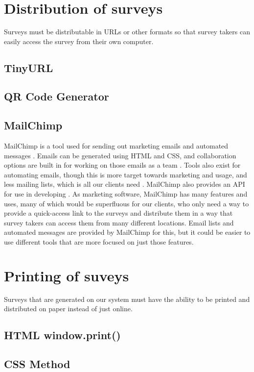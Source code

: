 \documentclass{IEEEtran}
\begin{document}
\section{Distribution of surveys}
Surveys must be distributable in URLs or other formats so that survey takers can easily access the survey from their own computer.
\subsection{TinyURL}
\subsection{QR Code Generator}
\subsection{MailChimp}
MailChimp is a tool used for sending out marketing emails and automated messages \cite{mailchimp}.
Emails can be generated using HTML and CSS, and collaboration options are built in for working on those emails as a team \cite{mailchimp_features, mailchimp_email}.
Tools also exist for automating emails, though this is more target towards marketing and usage, and less mailing lists, which is all our clients need \cite{mailchimp_features}.
MailChimp also provides an API for use in developing \cite{mailchimp_features}.
As marketing software, MailChimp has many features and uses, many of which would be superfluous for our clients, who only need a way to provide a quick-access link to the surveys and distribute them in a way that survey takers can access them from many different locations.
Email lists and automated messages are provided by MailChimp for this, but it could be easier to use different tools that are more focused on just those features.

\section{Printing of suveys}
Surveys that are generated on our system must have the ability to be printed and distributed on paper instead of just online.
\subsection{HTML window.print()}
\subsection{CSS Method} %
\end{document}
